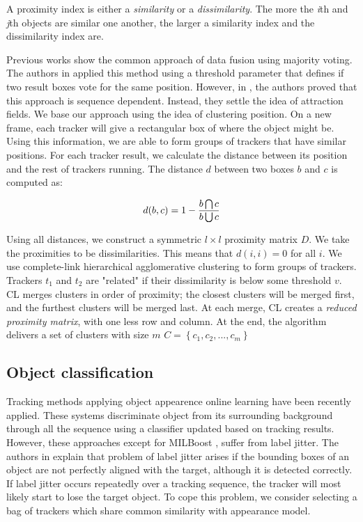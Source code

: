 A proximity index is either a \textit{similarity} or a \textit{dissimilarity}. The more the \textit{i}th and \textit{j}th objects are similar one another, the larger a similarity index and the dissimilarity index are.

Previous works show the common approach of data fusion using majority voting. The authors in \cite{Bailer2013} applied this method using a threshold parameter that defines if two result boxes vote for the same position. However, in \cite{Bailer2014}, the authors proved that this approach is sequence dependent. Instead, they settle the idea of attraction fields. We base our approach using the idea of clustering position. On a new frame, each tracker will give a rectangular box of where the object might be. Using this information, we are able to form groups of trackers that have similar positions. For each tracker result, we calculate the distance between its position and the rest of trackers running. The distance $d$ between two boxes $b$ and $c$ is computed as:

\begin{equation}
\large
d(b,c) = 1 - \frac{b\bigcap c}{b\bigcup  c}
\end{equation}

Using all distances, we construct a symmetric $l \times l$ proximity matrix $D$. We take the proximities to be dissimilarities. This means that $d(i,i) = 0$ for all $i$. We use complete-link hierarchical agglomerative clustering to form groups of trackers. Trackers $t_1$ and $t_2$ are "related" if their dissimilarity is below some threshold $v$. CL merges clusters in order of proximity; the closest clusters will be merged first, and the furthest clusters will be merged last. At each merge, CL creates a \textit{reduced proximity matrix}, with one less row and column. At the end, the algorithm delivers a set of clusters with size $m$ $C = \left \{ c_1, c_2, ..., c_m \right \}$

\subsection{Object classification}

Tracking methods applying object appearence online learning have been recently applied. These systems discriminate object from its surrounding background through all the sequence using a classifier updated based on tracking results. However, these approaches except for MILBoost \cite{Babenko2010}, suffer from label jitter. The authors in \cite{Santner2010} explain that problem of label jitter arises if the bounding boxes of an object are not perfectly aligned with the target, although it is detected correctly. If label jitter occurs repeatedly over a tracking sequence, the tracker will most likely start to lose the target object. To cope this problem, we consider selecting a bag of trackers which share common similarity with appearance model.

